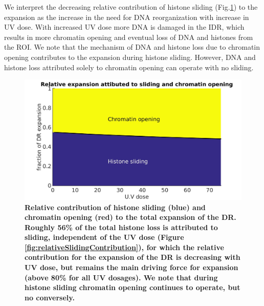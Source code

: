 \documentclass[12pt]{article}
\begin{document}
We interpret the decreasing relative contribution of histone sliding (Fig.\ref{fig:histoneAndDNARelativeExpansionContribution}) to the expansion as the increase in the need for DNA reorganization with increase in UV dose. With increased UV dose more DNA is damaged in the IDR, which results in more chromatin opening and eventual loss of DNA and histones from the ROI. We note that the mechanism of DNA and histone loss due to chromatin opening contributes to the expansion during histone sliding. However, DNA and histone loss attributed solely to chromatin opening can operate with no sliding.
\begin{figure}[http!]
\centering
\includegraphics[width=0.5\linewidth, height=0.3\textheight]{histoneAndDNARelativeExpansionContribution}
\caption{\textbf{Relative contribution of histone sliding (blue) and chromatin opening (red) to the total expansion of the DR. Roughly 56\% of the total histone loss is attributed to sliding, independent of the UV dose (Figure \ref{fig:relativeSlidingContribution}), for which the relative contribution for the expansion of the DR is decreasing with UV dose, but remains the main driving force for expansion (above 80\% for all UV dosages). We note that during histone sliding chromatin opening continues to operate, but no conversely.}}
\label{fig:histoneAndDNARelativeExpansionContribution}
\end{figure}
\end{document}
